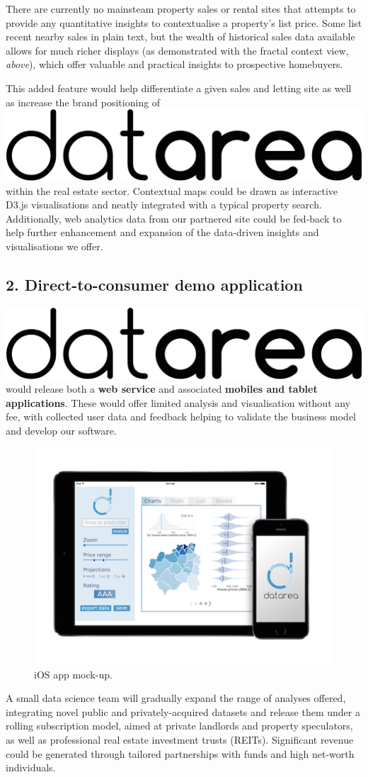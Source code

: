 \documentclass[
10pt, %
a4paper, %
oneside, %
headinclude,footinclude, %
BCOR5mm, %
]{scrartcl}
\newcommand*{\logo}{\includegraphics[scale=.04]{Figures/logotext.png}}
\begin{document}
There are currently no mainsteam property sales or rental sites that
attempts to provide any quantitative insights to contextualise a
property's list price. Some list recent nearby sales in plain text,
but the wealth of historical sales data available allows for much
richer displays (as demonstrated with the fractal context view,
\emph{above}), which offer valuable and practical insights to
prospective homebuyers.

This added feature would help differentiate a given sales and letting
site as well as increase the brand positioning of \logo\hspace{.1em}
within the real estate sector. Contextual maps could be drawn as
interactive D3.js visualisations and neatly integrated with a typical
property search. Additionally, web analytics data from our partnered
site could be fed-back to help further enhancement and expansion of
the data-driven insights and visualisations we offer.


\subsection*{2. Direct-to-consumer demo application}
\logo \hspace{.1em} would release both a {\bf web service} and associated
{\bf mobiles and tablet applications}. These would offer limited analysis and
visualisation without any fee, with collected user data and feedback helping to
validate the business model and develop our software.

\begin{figure}
\centering
\includegraphics[width=.39\textwidth]{Figures/mockup.png}
\caption{ iOS app mock-up.}
\vspace{-2em}
\end{figure}

A small data science team will gradually expand the range of analyses
offered, integrating novel public and privately-acquired datasets and
release them under a rolling subscription model, aimed at private
landlords and property speculators, as well as professional real
estate investment trusts (REITs). Significant revenue could be
generated through tailored partnerships with funds and high net-worth
individuals.
\end{document}
